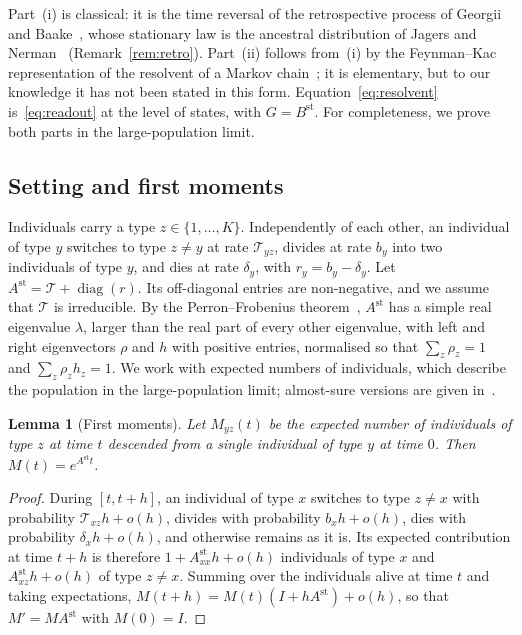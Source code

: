\documentclass[a4paper, 11pt]{article}
\DeclareMathOperator{\diag}{diag}
\newcommand{\Tg}{\mathcal{T}}
\theoremstyle{plain}
\newtheorem{lem}{Lemma}
\theoremstyle{remark}
\begin{document}
Part~(i) is classical: it is the time reversal of the retrospective process of Georgii and Baake~\cite{georgii2003ancestral}, whose stationary law is the ancestral distribution of Jagers and Nerman~\cite{jagers1996asymptotic} (Remark~\ref{rem:retro}). Part~(ii) follows from~(i) by the Feynman--Kac representation of the resolvent of a Markov chain~\cite{norris1997markov, delmoral2004feynman}; it is elementary, but to our knowledge it has not been stated in this form. Equation~\eqref{eq:resolvent} is~\eqref{eq:readout} at the level of states, with $G = B^{\mathrm{st}}$. For completeness, we prove both parts in the large-population limit.

\subsection{Setting and first moments}

Individuals carry a type $z \in \{1,\dots,K\}$. Independently of each other, an individual of type $y$ switches to type $z \neq y$ at rate $\Tg_{yz}$, divides at rate $b_y$ into two individuals of type $y$, and dies at rate $\delta_y$, with $r_y = b_y - \delta_y$. Let $A^{\mathrm{st}} = \Tg + \diag(r)$. Its off-diagonal entries are non-negative, and we assume that $\Tg$ is irreducible. By the Perron--Frobenius theorem~\cite{seneta2006nonnegative}, $A^{\mathrm{st}}$ has a simple real eigenvalue $\lambda$, larger than the real part of every other eigenvalue, with left and right eigenvectors $\rho$ and $h$ with positive entries, normalised so that $\sum_z \rho_z = 1$ and $\sum_z \rho_z h_z = 1$. We work with expected numbers of individuals, which describe the population in the large-population limit; almost-sure versions are given in~\cite{jagers1996asymptotic, georgii2003ancestral}.

\begin{lem}[First moments]\label{lem:moments}
Let $M_{yz}(t)$ be the expected number of individuals of type $z$ at time $t$ descended from a single individual of type $y$ at time $0$. Then $M(t) = e^{A^{\mathrm{st}}t}$.
\end{lem}
\begin{proof}
During $[t, t+h]$, an individual of type $x$ switches to type $z \neq x$ with probability $\Tg_{xz}h + o(h)$, divides with probability $b_x h + o(h)$, dies with probability $\delta_x h + o(h)$, and otherwise remains as it is. Its expected contribution at time $t+h$ is therefore $1 + A^{\mathrm{st}}_{xx}h + o(h)$ individuals of type $x$ and $A^{\mathrm{st}}_{xz}h + o(h)$ of type $z \neq x$. Summing over the individuals alive at time $t$ and taking expectations, $M(t+h) = M(t)(I + hA^{\mathrm{st}}) + o(h)$, so that $M' = MA^{\mathrm{st}}$ with $M(0) = I$.
\end{proof}
\end{document}
